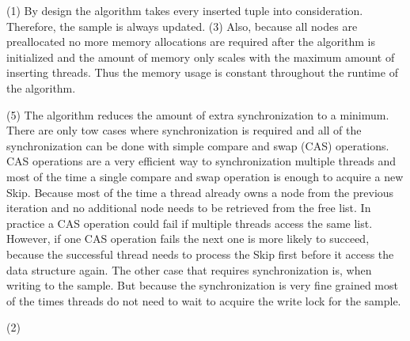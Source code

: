 \documentclass[sigconf,nonacm]{acmart}
\begin{document}
        (1) By design the algorithm takes every inserted tuple into consideration. Therefore, the sample is always updated. (3) Also, because all nodes are preallocated no more memory allocations are required after the algorithm is initialized and the amount of memory only scales with the maximum amount of inserting threads. Thus the memory usage is constant throughout the runtime of the algorithm. 

        (5) The algorithm reduces the amount of extra synchronization to a minimum. There are only tow cases where synchronization is required and all of the synchronization can be done with simple compare and swap (CAS) operations. CAS operations are a very efficient way to synchronization multiple threads and most of the time a single compare and swap operation is enough to acquire a new Skip. Because most of the time a thread already owns a node from the previous iteration and no additional node needs to be retrieved from the free list. In practice a CAS operation could fail if multiple threads access the same list. However, if one CAS operation fails the next one is more likely to succeed, because the successful thread needs to process the Skip first before it access the data structure again. The other case that requires synchronization is, when writing to the sample. But because the synchronization is very fine grained most of the times threads do not need to wait to acquire the write lock for the sample.

        (2) 

    
    
\end{document}
